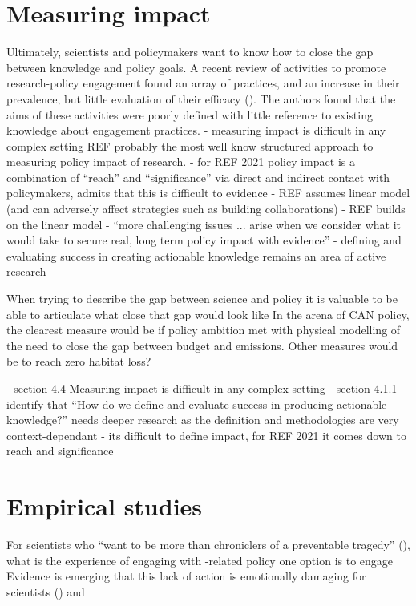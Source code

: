 \section{Measuring impact}
Ultimately, scientists and policymakers want to know how to close the gap between knowledge and policy goals. A recent review of activities to promote research-policy engagement found an array of practices, and an increase in their prevalence, but little evaluation of their efficacy (\cite{OliverHBGC2022}). The authors found that the aims of these activities were poorly defined with little reference to existing knowledge about engagement practices.  
\cite{BednarekSHG2015} - measuring impact is difficult in any complex setting
REF probably the most well know structured approach to measuring policy impact of research.
\cite{KEU2021impact} - for REF 2021 policy impact is a combination of ``reach'' and ``significance'' via direct and indirect contact with policymakers, admits that this is difficult to evidence
\cite{BoswellS2017} - REF assumes linear model (and can adversely affect strategies such as building collaborations)
\cite{Cairney2018} - REF builds on the linear model
\cite{CairneyO2020} - ``more challenging issues ... arise when we consider what it would take to secure real, long term policy impact with evidence''
\cite{JagannathanEtAl2023} - defining and evaluating success in creating actionable knowledge remains an area of active research

When trying to describe the gap between science and policy it is valuable to be able to articulate what close that gap would look like
In the arena of CAN policy, the clearest measure would be if policy ambition met with physical modelling of the need to close the gap between budget and emissions. Other measures would be to reach zero habitat loss? 

\cite{BednarekSHG2015} - section 4.4 Measuring impact is difficult in any complex setting 
\cite{JagannathanEtAl2023} - section 4.1.1 identify that ``How do we define and evaluate success in producing actionable knowledge?'' needs deeper research as the definition and methodologies are very context-dependant
\cite{KEU2021impact} - its difficult to define impact, for REF 2021 it comes down to reach and significance

\section{Empirical studies}
For scientists who ``want to be more than chroniclers of a preventable tragedy'' (\cite{WyattGT2024}), what is the experience of engaging with \CAN-related policy one option is to engage 
Evidence is emerging that this lack of action is emotionally damaging for \CAN{} scientists (\cite{Carrington2024}) and 

